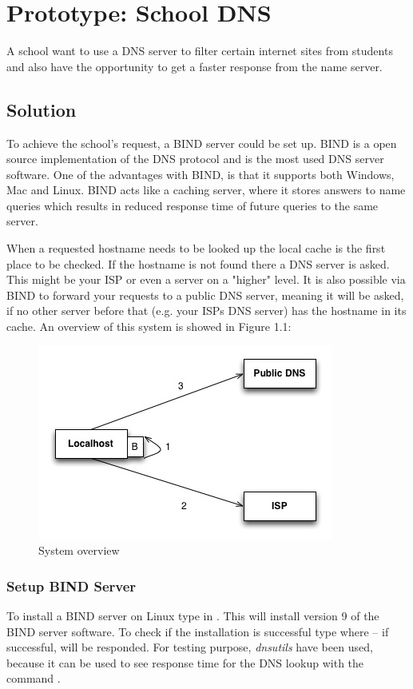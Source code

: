 \documentclass[Preamble]{subfiles}
\begin{document}
\chapter{Prototype: School DNS}
A school want to use a DNS server to filter certain internet sites from students and also have the opportunity to get a faster response from the name server. 

\section{Solution}
To achieve the school's request, a BIND server could be set up. 
BIND is a open source implementation of the DNS protocol and is the most used DNS server software. 
One of the advantages with BIND, is that it supports both Windows, Mac and Linux. 
BIND acts like a caching server, where it stores answers to name queries which results in reduced response time of future queries to the same server.

When a requested hostname needs to be looked up the local cache is the first place to be checked. 
If the hostname is not found there a DNS server is asked. 
This might be your ISP or even a server on a "higher" level. 
It is also possible via BIND to forward your requests to a public DNS server, meaning it will be asked, if no other server before that (e.g. your ISPs DNS server) has the hostname in its cache. An overview of this system is showed in Figure 1.1:

\begin{figure}[H]
\centering
\includegraphics[scale=0.5]{../../Protoypes/DNS/ForwardingDiagram.jpg}
\caption{System overview}
\label{fig:Forwarding}
\end{figure}


\subsection{Setup BIND Server}
To install a BIND server on Linux type in . This will install version 9 of the BIND server software. To check if the installation is successful type  where -- if successful,  will be responded. 
For testing purpose, \textit{dnsutils} have been used, because it can be used to see response time for the DNS lookup with the command .
\end{document}
